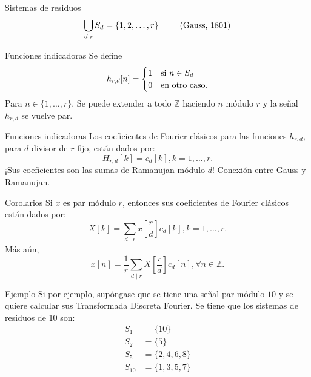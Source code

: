 \documentclass{beamer}
\begin{document}
\begin{frame}{Sistemas de residuos}
    \begin{equation*}
        \bigcup_{d \mid r} S_d = \{ 1,2,\ldots,r \} \hspace{2.5em} (\text{Gauss, 1801})
    \end{equation*}
\end{frame}

\begin{frame}{Funciones indicadoras}
    Se define
    \begin{equation*}
        h_{r,d}[n] = \begin{cases}
            \hfil 1 & \text{si } n \in S_d \\
            \hfil 0 & \text{en otro caso.}
        \end{cases}
    \end{equation*}
    Para $n \in \{ 1,\ldots,r \}$. Se puede extender a todo $\mathbb{Z}$ haciendo $n$ módulo $r$ y la señal $h_{r,d}$ se vuelve par.
\end{frame}

\begin{frame}{Funciones indicadoras}
    Los coeficientes de Fourier clásicos para las funciones $h_{r,d}$, para $d$ divisor de $r$ fijo, están dados por:
    \begin{equation*}
        H_{r,d}[k] = c_d[k], k=1,\ldots,r.
    \end{equation*}
    ¡Sus coeficientes son las sumas de Ramanujan módulo $d$! Conexión entre Gauss y Ramanujan.
\end{frame}

\begin{frame}{Corolarios}
    Si $x$ es par módulo $r$, entonces sus coeficientes de Fourier clásicos están dados por:
    \begin{equation*}
        X[k] = \sum_{d \mid r} x \left[ \frac{r}{d} \right] c_d[k], k=1,\ldots,r.
    \end{equation*}
    Más aún,
    \begin{equation*}
        x[n] = \frac{1}{r} \sum_{d \mid r} X \left[ \frac{r}{d} \right] c_d[n], \forall n \in \mathbb{Z}.
    \end{equation*}
\end{frame}

\begin{frame}{Ejemplo}
    Si por ejemplo, supóngase que se tiene una señal par módulo $10$ y se quiere calcular sus Transformada Discreta Fourier. Se tiene que los sistemas de residuos de 10 son:
    \begin{align*}
        S_1 & = \{ 10 \} \\
        S_2 & = \{ 5 \} \\
        S_5 & = \{ 2, 4, 6, 8 \} \\
        S_{10} & = \{ 1, 3, 5, 7 \} 
    \end{align*}
\end{frame}
\end{document}
